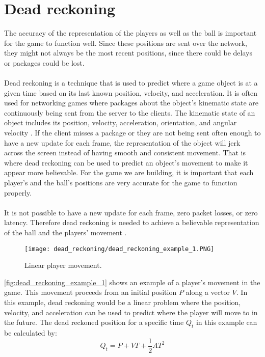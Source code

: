 \section{Dead reckoning}\label{sec:dead-reckoning}
The accuracy of the representation of the players as well as the ball is important for the game to function well.
Since these positions are sent over the network, they might not always be the most recent positions, since there could be delays or packages could be lost.
\\\\
Dead reckoning is a technique that is used to predict where a game object is at a given time based on its last known position, velocity, and acceleration.
It is often used for networking games where packages about the object's kinematic state are continuously being sent from the server to the clients.
The kinematic state of an object includes its position, velocity, acceleration, orientation, and angular velocity \cite{deadreckoning}.
If the client misses a package or they are not being sent often enough to have a new update for each frame, the representation of the object will jerk across the screen instead of having smooth and consistent movement.
That is where dead reckoning can be used to predict an object's movement to make it appear more believable.
For the game we are building, it is important that each player's and the ball's positions are very accurate for the game to function properly.
\\\\
It is not possible to have a new update for each frame, zero packet losses, or zero latency.
Therefore dead reckoning is needed to achieve a believable representation of the ball and the players' movement \cite{deadreckoning}.
\begin{figure}[H]
    \centering
    \texttt{[image: dead\_reckoning/dead\_reckoning\_example\_1.PNG]}
    \caption{Linear player movement.}
    \label{fig:dead_reckoning_example_1}
\end{figure}
\noindent
\autoref{fig:dead_reckoning_example_1} shows an example of a player's movement in the game.
This movement proceeds from an initial position $P$ along a vector $V$.
In this example, dead reckoning would be a linear problem where the position, velocity, and acceleration can be used to predict where the player will move to in the future.
The dead reckoned position for a specific time $Q_t$ in this example can be calculated by:
\begin{displaymath}
    Q_t = P + VT + \frac{1}{2}AT^2
\end{displaymath}
